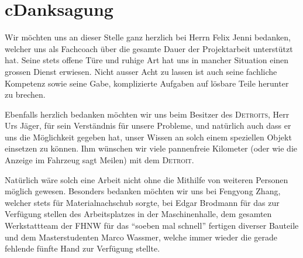 \chapter*{c\quad Danksagung}
Wir möchten uns an dieser Stelle ganz herzlich bei Herrn Felix Jenni bedanken, welcher uns als Fachcoach über die gesamte Dauer der Projektarbeit unterstützt hat. Seine stets offene Türe und ruhige Art hat uns in mancher Situation einen grossen Dienst erwiesen. Nicht ausser Acht zu lassen ist auch seine fachliche Kompetenz sowie seine Gabe, komplizierte Aufgaben auf lösbare Teile herunter zu brechen.

Ebenfalls herzlich bedanken möchten wir uns beim Besitzer des \textsc{Detroits}, Herr Urs Jäger, für sein Verständnis für unsere Probleme, und natürlich auch dass er uns die Möglichkeit gegeben hat, unser Wissen an solch einem speziellen Objekt einsetzen zu können. Ihm wünschen wir viele pannenfreie Kilometer (oder wie die Anzeige im Fahrzeug sagt Meilen) mit dem \textsc{Detroit}.

Natürlich wäre solch eine Arbeit nicht ohne die Mithilfe von weiteren Personen möglich gewesen. Besonders bedanken möchten wir uns bei Fengyong Zhang, welcher stets für Materialnachschub sorgte, bei Edgar Brodmann für das zur Verfügung stellen des Arbeitsplatzes in der Maschinenhalle, dem gesamten Werkstattteam der FHNW für das "`soeben mal schnell"' fertigen diverser Bauteile und dem Masterstudenten Marco Wassmer, welche immer wieder die gerade fehlende fünfte Hand zur Verfügung stellte.

\color{black}
